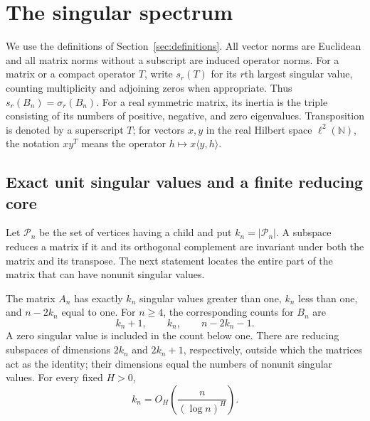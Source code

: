 \section{The singular spectrum}\label{sec:spectral}

We use the definitions of Section~\ref{sec:definitions}. All vector norms are Euclidean and all matrix norms without a subscript are induced operator norms. For a matrix or a compact operator $T$, write $s_r(T)$ for its $r$th largest singular value, counting multiplicity and adjoining zeros when appropriate. Thus $s_r(B_n)=\sigma_r(B_n)$. For a real symmetric matrix, its inertia is the triple consisting of its numbers of positive, negative, and zero eigenvalues. Transposition is denoted by a superscript $T$; for vectors $x,y$ in the real Hilbert space $\ell^2(\mathbb N)$, the notation $xy^T$ means the operator $h\mapsto x\langle y,h\rangle$.

\subsection{Exact unit singular values and a finite reducing core}

Let $\mathcal P_n$ be the set of vertices having a child and put $k_n=|\mathcal P_n|$. A subspace reduces a matrix if it and its orthogonal complement are invariant under both the matrix and its transpose. The next statement locates the entire part of the matrix that can have nonunit singular values.

\begin{theorem}\label{spec:core}
The matrix $A_n$ has exactly $k_n$ singular values greater than one, $k_n$ less than one, and $n-2k_n$ equal to one. For $n\ge4$, the corresponding counts for $B_n$ are
\[
 k_n+1,\qquad k_n,\qquad n-2k_n-1.
\]
A zero singular value is included in the count below one. There are reducing subspaces of dimensions $2k_n$ and $2k_n+1$, respectively, outside which the matrices act as the identity; their dimensions equal the numbers of nonunit singular values. For every fixed $H>0$,
\begin{equation}\label{spec:parentbound}
 k_n=O_H\!\left(\frac{n}{(\log n)^H}\right).
\end{equation}
\end{theorem}

